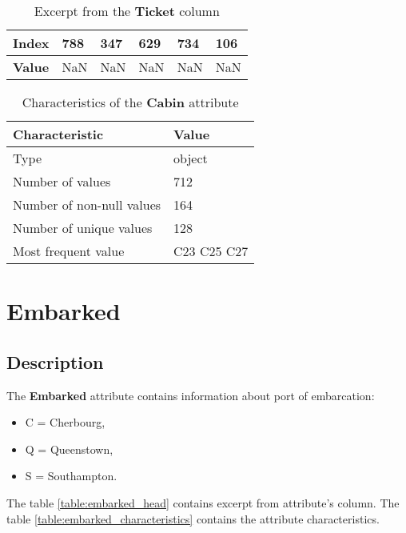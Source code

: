 \begin{table}[!hp]
    \centering
    \caption{Excerpt from the \textbf{Ticket} column}
    \begin{tabular}{|l|l|l|l|l|l|}
        \hline
        \textbf{Index} & 788 & 347 & 629 & 734 & 106 \\ \hline
        \textbf{Value} & NaN & NaN & NaN & NaN & NaN \\ \hline
    \end{tabular}
    \label{table:cabin_head}
\end{table}

\begin{table}[!hp]
    \centering
    \caption{Characteristics of the \textbf{Cabin} attribute}
    \begin{tabular}{|l|l|}
        \hline
        \textbf{Characteristic}   & \textbf{Value} \\ \hline
        Type                      & object         \\ \hline
        Number of values          & 712            \\ \hline
        Number of non-null values & 164            \\ \hline
        Number of unique values   & 128            \\ \hline
        Most frequent value       & C23 C25 C27    \\ \hline
    \end{tabular}
    \label{table:cabin_characteristics}
\end{table}


\section{Embarked} \label{section:Embarked}
\subsection{Description}
The \textbf{Embarked} attribute contains information about port of 
embarcation:
\begin{itemize}
    \item C = Cherbourg,
    \item Q = Queenstown,
    \item S = Southampton.
\end{itemize}

The table \ref{table:embarked_head} contains excerpt from attribute's column.
The table \ref{table:embarked_characteristics} contains the attribute 
characteristics.

